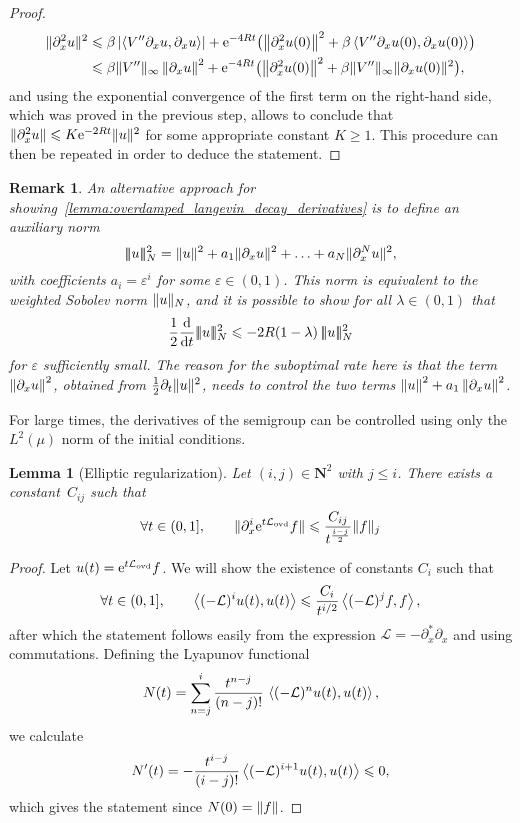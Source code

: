 \documentclass[11pt,a4paper]{article}
\newcommand{\e}{\mathrm{e}}
\newcommand{\nat}{\mathbf N}
\theoremstyle{plain}
\newtheorem{lemma}{Lemma}[section]
\newtheorem{remark}{Remark}[section]
\numberwithin{equation}{section}
\renewcommand{\leq}{\leqslant}
\renewcommand{\geq}{\geqslant}
\begin{document}
\begin{proof}
    \begin{align*}
        \norm*{\partial_x^2 u}^2
        &\leq \beta \abs{\ip{V'' \partial_x u}{\partial_x u}} + \e^{-4Rt} \bigl( \norm{\partial_x^2 u(0)}^2 + \beta \ip{V'' \partial_x u(0)}{\partial_x u(0)} \bigr) \\
        &\leq \beta \norm*{V''}_{\infty} \norm{\partial_x u}^2 + \e^{-4Rt} \bigl( \norm{\partial_x^2 u(0)}^2 + \beta \norm*{V''}_{\infty} \norm*{\partial_x u(0)}^2 \bigr),
    \end{align*}
    and using the exponential convergence of the first term on the right-hand side,
    which was proved in the previous step,
    allows to conclude that $\norm*{\partial_x^2 u} \leq K \e^{-2 Rt} \norm*{u}^2$ for some appropriate constant $K \geq 1$.
    This procedure can then be repeated in order to deduce the statement.
\end{proof}

\newcommand{\auxnorm}[1]{|\!|\!| #1 |\!|\!|}
\begin{remark}
    An alternative approach for showing~\cref{lemma:overdamped_langevin_decay_derivatives} is
    to define an auxiliary norm
    \[
        \auxnorm{u}_N^2 = \norm*{u}^2 + a_1 \norm*{\partial_x u}^2 + \dotsc + a_N \norm*{\partial_x^N u}^2,
    \]
    with coefficients $a_i = \varepsilon^i$ for some $\varepsilon \in (0, 1)$.
    This norm is equivalent to the weighted Sobolev norm $\norm*{u}_N$,
    and it is possible to show for all $\lambda \in (0, 1)$ that
    \[
        \frac{1}{2}\derivative*{1}{t} \auxnorm{u}_N^2 \leq - 2 R(1 - \lambda) \, \auxnorm{u}_N^2
    \]
    for $\varepsilon$ sufficiently small.
    The reason for the suboptimal rate here is that the term $\norm{\partial_x u}^2$,
    obtained from $\frac{1}{2} \partial_t \norm*{u}^2$,
    needs to control the two terms $\norm{u}^2 + a_1 \norm{\partial_x u}^2$.
\end{remark}

For large times,
the derivatives of the semigroup can be controlled using only the $L^2(\mu)$ norm of the initial conditions.
\begin{lemma}
    [Elliptic regularization]
    \label{lemma:elliptic_reg}
    Let $(i,j) \in \nat^2$ with $j \leq i$.
    There exists a constant~$C_{ij}$ such that
    \[
        \forall t \in (0, 1], \qquad
        \norm*{\partial_x^i \e^{t \mathcal L_{\rm ovd}} f} \leq \frac{C_{ij}}{t^{\frac{i-j}{2}}} \norm*{f}[j]
    \]
\end{lemma}
\begin{proof}
    Let $u(t) = \e^{t \mathcal L_{\rm ovd}} f$.
    We will show the existence of constants $C_i$ such that
    \[
        \forall t \in (0, 1], \qquad
        \ip{(-\mathcal L)^i u(t)}{u(t)}
        \leq \frac{C_i}{t^{i/2}} \ip{(-\mathcal L)^j f}{f},
    \]
    after which the statement follows easily from the expression $\mathcal L = - \partial_x^* \partial_x$ and using commutations.
    Defining the Lyapunov functional
    \[
        N(t) = \sum_{n=j}^{i} \frac{t^{n-j}}{(n-j)!} \, \ip{(-\mathcal L)^n u(t)}{u(t)} ,
    \]
    we calculate
    \[
        N'(t) =  - \frac{t^{i-j}}{(i-j)!} \ip{(- \mathcal L)^{i+1} u(t)}{u(t)} \leq 0,
    \]
    which gives the statement since $N(0) = \norm{f}$.
\end{proof}
\end{document}
